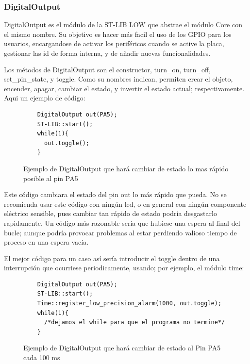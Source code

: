 \documentclass{report}
\begin{document}
\subsubsection{DigitalOutput}
DigitalOutput es el módulo de la ST-LIB LOW que abstrae el módulo Core con el mismo nombre. Su objetivo es hacer más facil el uso de los GPIO para los usuarios, encargandose de activar los periféricos cuando se active la placa, gestionar las id de forma interna, y de añadir nuevas funcionalidades. 
\par \vspace{0.3cm}
Los métodos de DigitalOutput son el constructor, turn\_on, turn\_off, set\_pin\_state, y toggle. Como su nombres indican, permiten crear el objeto, encender, apagar, cambiar el estado, y invertir el estado actual; respectivamente. Aqui un ejemplo de código: 
\begin{figure}[H]
  \begin{lstlisting}
    DigitalOutput out(PA5);
    ST-LIB::start();
    while(1){
      out.toggle();
    }
  \end{lstlisting}
  \caption{Ejemplo de DigitalOutput que hará cambiar de estado lo mas rápido posible al pin PA5}
  \label{DigitalOutputCode}
\end{figure}
\par \vspace{0.3cm}
Este código cambiara el estado del pin out lo más rápido que pueda. No se recomienda usar este código con ningún led, o en general con ningún componente eléctrico sensible, pues cambiar tan rápido de estado podría desgastarlo rapidamente. Un código más razonable sería que hubiese una espera al final del bucle; aunque podría provocar problemas al estar perdiendo valioso tiempo de proceso en una espera vacía. \par
El mejor código para un caso así sería introducir el toggle dentro de una interrupción que ocurriese periodicamente, usando; por ejemplo, el módulo time: 
\begin{figure}[H]
  \begin{lstlisting}
    DigitalOutput out(PA5);
    ST-LIB::start();
    Time::register_low_precision_alarm(1000, out.toggle);
    while(1){
      /*dejamos el while para que el programa no termine*/
    }
  \end{lstlisting}
  \caption{Ejemplo de DigitalOutput que hará cambiar de estado al Pin PA5 cada 100 ms}
  \label{DigitalOutputBetterCode}
\end{figure}
\end{document}
